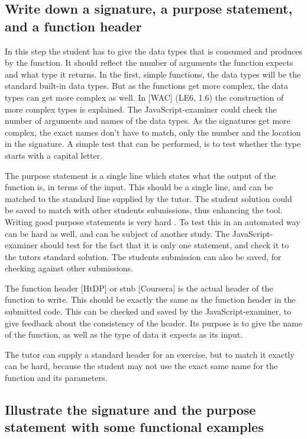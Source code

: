 \subsection{Write down a signature, a purpose statement, and a function header}
In this step the student has to give the data types that is consumed and produces
by the function.
It should reflect the number of arguments the function expects and what type it
returns.
In the first, simple functions, the data types will be the standard built-in
data types. But as the functions get more complex, the data types can get more
complex as well.
In [WAC] (LE6, 1.6) the construction of more complex types is explained.
The JavaScript-examiner could check the number of arguments and names of the
data types. As the signatures get more complex, the exact names don't have to
match, only the number and the location in the signature. A simple test that
can be performed, is to test whether the type starts with a capital letter.

The purpose statement is a single line which states what the output of the
function is, in terms of the input. This should be a single line, and can be
matched to the standard line supplied by the tutor.
The student solution could be saved to match with other students submissions,
thus enhancing the tool.
Writing good purpose statements is very hard \citet{Ramsey:2014TDP}.
To test this in an automated way can be hard as well, and can be subject of
another study. The JavaScript-examiner should test for the fact that it is only
one statement, and check it to the tutors standard solution. The students
submission can also be saved, for checking against other submissions.


The function header [HtDP] or stub [Coursera] is the actual header of the
function to write. This should be exactly the same as the function header in the
submitted code.
This can be checked and saved by the JavaScript-examiner, to give feedback about
the consistency of the header.
Its purpose is to give the name of the function, as well as the type of data it
expects as its input.

The tutor can supply a standard header for an exercise, but to match it exactly
can be hard, because the student may not use the exact same name for the
function and its parameters.


\subsection{Illustrate the signature and the purpose statement with some functional examples}

